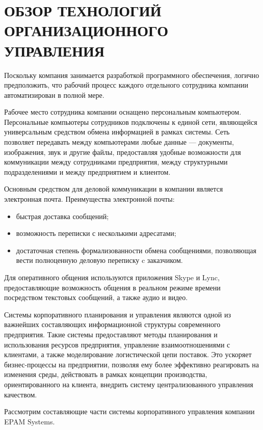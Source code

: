 \section[Обзор технологий организационного управления]{%
  ОБЗОР ТЕХНОЛОГИЙ ОРГАНИЗАЦИОННОГО \\
  УПРАВЛЕНИЯ
}
\label{sec:org_management}

Поскольку компания занимается разработкой программного обеспечения,
логично предположить, что рабочий процесс каждого отдельного сотрудника компании
автоматизирован в полной мере.

Рабочее место сотрудника компании оснащено персональным компьютером. 
Персональные компьютеры сотрудников подключены к единой сети, являющейся
универсальным средством обмена информацией в рамках системы.
Сеть позволяет передавать между компьютерами любые данные --- 
документы, изображения, звук и другие файлы, предоставляя удобные возможности
для коммуникации между сотрудниками предприятия, между структурными подразделениями 
и между предприятием и клиентом. 

Основным средством для деловой коммуникации в компании является электронная почта.
Преимущества электронной почты:
\begin{itemize}
\item быстрая доставка сообщений; 
\item возможность переписки с несколькими адресатами;
\item достаточная степень формализованности обмена сообщениями,
  позволяющая вести полноценную деловую переписку c заказчиком.
\end{itemize}

Для оперативного общения используются приложения Skype и Lync,
предоставляющие возможность общения в реальном режиме времени 
посредством текстовых сообщений, а также аудио и видео.

Системы корпоративного планирования и управления являются одной из
важнейших составляющих информационной структуры современного предприятия.
Такие системы предоставляют методы планирования и использования ресурсов предприятия, 
управление взаимоотношениями с клиентами, а также моделирование логистической цепи поставок.
Это ускоряет бизнес-процессы на предприятии, позволяя ему более эффективно реагировать на
изменения среды, действовать в рамках концепции производства, ориентированного на клиента,
внедрить систему централизованного управления качеством.

Рассмотрим составляющие части системы корпоративного управления 
компании EPAM Systems.

